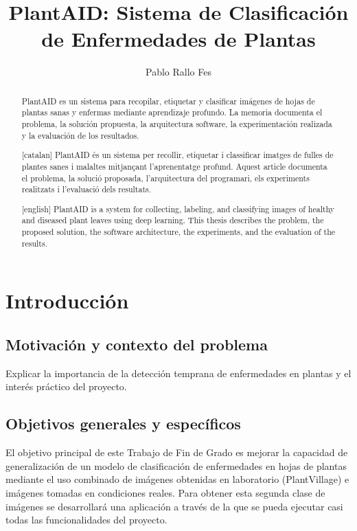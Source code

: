 \documentclass[11pt,spanish,listoffigures,listoftables]{tfgetsinf}
\title{PlantAID: Sistema de Clasificación de Enfermedades de Plantas}
\author{Pablo Rallo Fes}
\begin{document}
\begin{abstract}
PlantAID es un sistema para recopilar, etiquetar y clasificar imágenes de hojas de plantas sanas y enfermas mediante aprendizaje profundo. La memoria documenta el problema, la solución propuesta, la arquitectura software, la experimentación realizada y la evaluación de los resultados.

\end{abstract}

\begin{abstract}[catalan]
PlantAID és un sistema per recollir, etiquetar i classificar imatges de fulles de plantes sanes i malaltes mitjançant l'aprenentatge profund. Aquest article documenta el problema, la solució proposada, l'arquitectura del programari, els experiments realitzats i l'evaluació dels resultats.
\end{abstract}

\begin{abstract}[english]
PlantAID is a system for collecting, labeling, and classifying images of healthy and diseased plant leaves using deep learning. This thesis describes the problem, the proposed solution, the software architecture, the experiments, and the evaluation of the results.
\end{abstract}

\mainmatter

\chapter{Introducción}
\section{Motivación y contexto del problema}
Explicar la importancia de la detección temprana de enfermedades en plantas y el interés práctico del proyecto.

\section{Objetivos generales y específicos}
El objetivo principal de este Trabajo de Fin de Grado es mejorar la capacidad de generalización de un modelo de clasificación de enfermedades en hojas de plantas mediante el uso combinado de imágenes obtenidas en laboratorio (PlantVillage) e imágenes tomadas en condiciones reales. Para obtener esta segunda clase de imágenes se desarrollará una aplicación a través de la que se pueda ejecutar casi todas las funcionalidades del proyecto.
\end{document}
